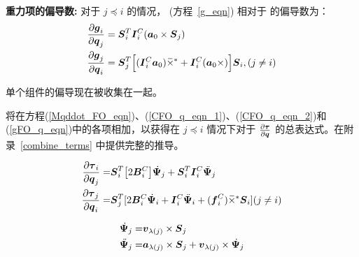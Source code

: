 \documentclass[letterpaper, 10 pt, conference]{ieeetran}  %
\begin{document}
\vspace{1ex}
{\noindent \bf 重力项的偏导数:}  对于 $j \preceq i$ 的情况， (方程~\ref{g_eqn}) 相对于  的偏导数为：
\begin{equation}
    \begin{aligned}
         &  \frac{\partial \red{\g_{i}}}{ \partial \red{\q_{j}}} = \red{\Phibar_{i}^{T}  \I_{i}^{C}(\a_{0} \times \Phibar_{j})} \\
        & \frac{\partial \red{\g_{j}}}{ \partial \red{\q_{i}}} = \red{\Phibar_{j}^{T} \Big[(\I_{i}^{C}\a_{0})\crff + \I_{i}^{C}(\a_{0} \times ) \Big]\Phibar_{i} , (j \neq i)}
        \label{gFO_q_eqn}
    \end{aligned}
\end{equation}



 单个组件的偏导现在被收集在一起。

\noindent 将在方程(\ref{Mqddot_FO_eqn})、(\ref{CFO_q_eqn_1})、(\ref{CFO_q_eqn_2})和(\ref{gFO_q_eqn})中的各项相加，以获得在 $j \preceq i$ 情况下对于 $\frac{\partial \boldsymbol{\tau}}{\partial \boldsymbol{q}}$ 的总表达式。在附录~\ref{combine_terms} 中提供完整的推导。

\begin{align}
        \frac{\partial \red{\taubar_{i}}}{\partial \red{\q_{j}}} = & \red{ \Phibar_{i}^{T} \big[ 2  \B_{i}^{C} \big] \Psibardot{}_{j} + \Phibar_{i}^{T}  \I_{i}^{C} \Psibarddot{}_{j} } \label{IDFO_SVA_eq1} \\
        \frac{\partial \red{\taubar_{j}}}{\partial \red{\q_{i}}} = & \red{\Phibar_{j}^{T} [ 2 \B_{i}^{C} \Psibardot_{i} +  \I_{i}^{C}  \Psibarddot_{i}+(\f_{i}^{C} )\crff \Phibar_{i}  ] (j \neq i)} \nonumber
\end{align}

\begin{align}
\begin{split}
  \red{\Psibardot_{j} = }& \red{\v_{\lambda(j)} \times \Phibar_j} \\
\red{ \Psibarddot_{j} = }& \red{\a_{\lambda(j)} \times \Phibar_{j} + \v_{\lambda(j)} \times \Psibardot_{j}}
\end{split}
\label{psidot_psidotdot_defn}
\end{align}
\end{document}

